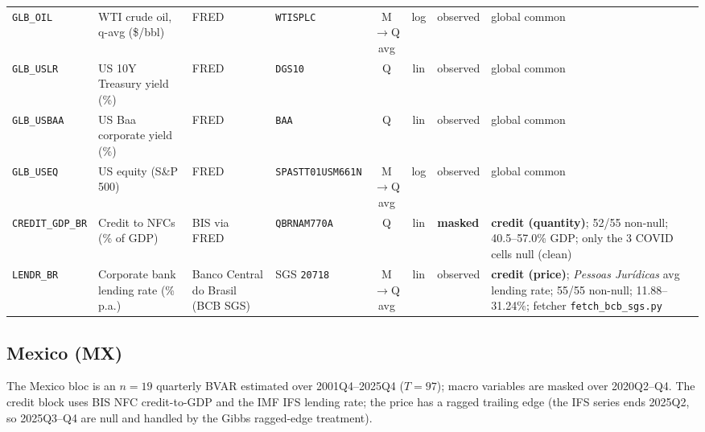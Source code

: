 {\begin{longtable}{@{}llp{2.5cm}p{2.4cm}cclp{2.6cm}@{}}
\texttt{GLB\_OIL} & WTI crude oil, q-avg (\$/bbl) & FRED & \texttt{WTISPLC} & M$\to$Q avg & log & observed & global common \\
\texttt{GLB\_USLR} & US 10Y Treasury yield (\%) & FRED & \texttt{DGS10} & Q & lin & observed & global common \\
\texttt{GLB\_USBAA} & US Baa corporate yield (\%) & FRED & \texttt{BAA} & Q & lin & observed & global common \\
\texttt{GLB\_USEQ} & US equity (S\&P 500) & FRED & \texttt{SPASTT01USM661N} & M$\to$Q avg & log & observed & global common \\
\texttt{CREDIT\_GDP\_BR} & Credit to NFCs (\% of GDP) & BIS via FRED & \texttt{QBRNAM770A} & Q & lin & \textbf{masked} & \textbf{credit (quantity)}; 52/55 non-null; 40.5--57.0\% GDP; only the 3 COVID cells null (clean) \\
\texttt{LENDR\_BR} & Corporate bank lending rate (\% p.a.) & Banco Central do Brasil (BCB SGS) & SGS \texttt{20718} & M$\to$Q avg & lin & observed & \textbf{credit (price)}; \emph{Pessoas Jur\'idicas} avg lending rate; 55/55 non-null; 11.88--31.24\%; fetcher \texttt{fetch\_bcb\_sgs.py} \\
\end{longtable}}

\subsection{Mexico (MX)}\label{sec:data:MX}

The Mexico bloc is an $n=19$ quarterly BVAR estimated over 2001Q4--2025Q4
($T=97$); macro variables are masked over 2020Q2--Q4. The credit block uses
BIS NFC credit-to-GDP and the IMF IFS lending rate; the price has a ragged
trailing edge (the IFS series ends 2025Q2, so 2025Q3--Q4 are null and handled
by the Gibbs ragged-edge treatment).

